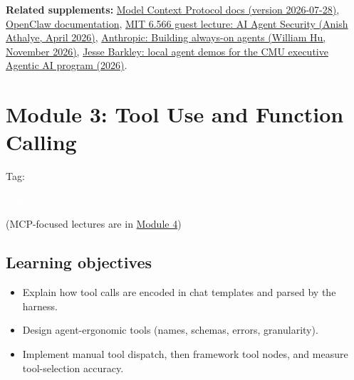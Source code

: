 \documentclass[10pt,oneside]{report}
\newcommand{\tg}[1]{{\setlength{\fboxsep}{1.2pt}\colorbox{tag#1}{\kern1pt\textcolor{white}{\sffamily\bfseries\fontsize{5.5}{6}\selectfont\strut #1}\kern1.5pt}}}
\begin{document}
\textbf{Related supplements:} \hyperref[sup-mcp]{Model Context Protocol docs (version 2026-07-28)}, \hyperref[sup-openclaw]{OpenClaw documentation}, \hyperref[sup-agentsec]{MIT 6.566 guest lecture: AI Agent Security (Anish Athalye, April 2026)}, \hyperref[sup-alwayson]{Anthropic: Building always-on agents (William Hu, November 2026)}, \hyperref[sup-barkley]{Jesse Barkley: local agent demos for the CMU executive Agentic AI program (2026)}.
\chapter{Module 3: Tool Use and Function Calling}\hypertarget{mod-TOOL}{}
{\small Tag: \tg{TOOL} (MCP-focused lectures are in \hyperlink{mod-MCP}{Module 4})}
\section{Learning objectives}
\begin{itemize}
\item Explain how tool calls are encoded in chat templates and parsed by the harness.
\item Design agent-ergonomic tools (names, schemas, errors, granularity).
\item Implement manual tool dispatch, then framework tool nodes, and measure tool-selection accuracy.
\end{itemize}
\end{document}
